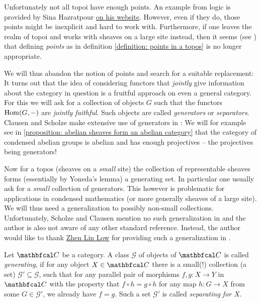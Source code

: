 Unfortunately not all topoi have enough points. An example from logic is provided by Sina Hazratpour \href{https://sinhp.github.io/scribbling/22-11-2017-a-topos-without-points}{on his website}. However, even if they do, those points might be inexplicit and hard to work with. Furthermore, if one leaves the realm of topoi and works with sheaves on a large site instead, then it seems (see \cite{pointsPretopoiLargeSite}) that defining \emph{points} as in definition \ref{definition: points in a topos} is no longer appropriate.

We will thus abandon the notion of points and search for a suitable replacement: It turns out that the idea of considering functors that \emph{jointly} give information about the category in question is a fruitful approach on even a general category. For this we will ask for a collection of objects $G$ such that the functors ${\operatorname{Hom}}(G, -)$ are \emph{jointly faithful}. Such objects are called \emph{generators} or \emph{separators}. Clausen and Scholze make extensive use of generators in \cite{condenseddotpdf}: We will for example see in \ref{proposition: abelian sheaves form an abelian category} that the category of condensed abelian groups is abelian and has enough projectives -- the projectives being generators!

Now for a topos (\ie sheaves on a \emph{small} site) the collection of representable sheaves forms (essentially by Yoneda's lemma) a generating set. In particular one usually ask for a \emph{small} collection of generators. This however is problematic for applications in condensed mathematics (or more generally sheaves of a large site). We will thus need a generalization to possibly non-small collections. Unfortunately, Scholze and Clausen mention no such generalization in \eg \cite{condenseddotpdf} and the author is also not aware of any other standard reference. Instead, the author would like to thank \href{https://zll22.user.srcf.net/profile/}{Zhen Lin Low} for providing such a generalization in \cite{generationZhenLin}.
\begin{definition}[Generation]
	\label{definition: generation}
	
	Let $\category C$ be a category. A class $\mathcal G$ of objects of $\category C$ is called \emph{generating}, if for any object $X\in \category C$ there is a small(!) collection (\ie a set) $\mathcal G'\subseteq \mathcal G$, such that for any parallel pair of morphisms $f,g \colon X\to Y$ in $\category C$ with the property that $f\circ h = g\circ h$ for any map $h\colon G\to X$ from some $G\in\mathcal G'$, we already have $f=g$. Such a set $\mathcal G'$ is called \emph{separating for $X$}.
\end{definition}

